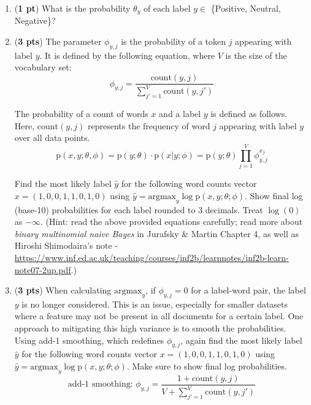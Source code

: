 \documentclass[11pt, letterpaper]{article}
\begin{document}
    \begin{enumerate}[label=\alph*.]
        \item (\textbf{1 pt}) What is the probability $\theta_y$ of each label $y \in$ \{Positive, Neutral, Negative\}?\\
        
        \item (\textbf{3 pts}) The parameter $\phi_{y, j}$ is the probability of a token $j$ appearing with label $y$. It is defined by the following equation, where $V$ is the size of the vocabulary set:
        $$ \phi_{y, j} = \frac{\text{count}(y, j)}{\sum^V_{j'=1}\text{count}(y, j')}$$
        
        The probability of a count of words $x$ and a label $y$ is defined as follows. Here, $\text{count}(y, j)$ represents the frequency of word $j$ appearing with label $y$ over all data points. 
        $$ \mathrm{p}(x, y; \theta, \phi) = \mathrm{p}(y; \theta) \cdot \mathrm{p}(x|y; \phi) = \mathrm{p}(y; \theta)\prod^V_{j=1} \phi^{x_j}_{y, j} $$
        
        Find the most likely label $\hat y$ for the following word counts vector $x = (1,0,0,1,1,0,1,0)$ using $\hat y = \text{argmax}_y \log \mathrm{p}(x, y; \theta; \phi)$. Show final log (base-10) probabilities for each label rounded to 3 decimals. Treat $\log(0)$ as $-\infty$. (Hint: read the above provided equations carefully; read more about \textit{binary multinomial naive Bayes} in Jurafsky \& Martin Chapter 4, as well as Hiroshi Shimodaira's note - \url{https://www.inf.ed.ac.uk/teaching/courses/inf2b/learnnotes/inf2b-learn-note07-2up.pdf}.)
        
        \item (\textbf{3 pts}) When calculating $\text{argmax}_y$, if $\phi_{y, j} = 0$ for a label-word pair, the label $y$  is no longer considered. This is an issue, especially for smaller datasets where a feature may not be present in all documents for a certain label. One approach to mitigating this high variance is to smooth the probabilities. Using add-1 smoothing, which redefines $\phi_{y, j}$, again find the most likely label $\hat y$ for the following word counts vector $x = (1,0,0,1,1,0,1,0)$ using $\hat y = \text{argmax}_y \log \mathrm{p}(x, y; \theta; \phi)$. Make sure to show final log probabilities.\\
        $$\text{add-1 smoothing: } \phi_{y, j} = \frac{1 + \text{count}(y, j)}{V + \sum^V_{j'=1}\text{count}(y, j')}$$\\
    \end{enumerate}
    
\end{document}
